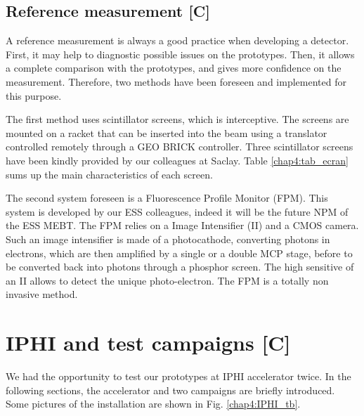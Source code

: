 \begin{refsection}
  \subsection{Reference measurement [C]}
  A reference measurement is always a good practice when developing a detector. First, it may help to diagnostic possible issues on the prototypes. Then, it allows a complete comparison with the prototypes, and gives more confidence on the measurement. Therefore, two methods have been foreseen and implemented for this purpose.

  The first method uses scintillator screens, which is interceptive. The screens are mounted on a racket that can be inserted into the beam using a translator controlled remotely through a GEO BRICK controller. Three scintillator screens have been kindly provided by our colleagues at Saclay. Table \ref{chap4:tab_ecran} sums up the main characteristics of each screen.

  

  The second system foreseen is a Fluorescence Profile Monitor (FPM). This system is developed by our ESS colleagues, indeed it will be the future NPM of the ESS MEBT. The FPM relies on a Image Intensifier (II) and a CMOS camera.
  Such an image intensifier is made of a photocathode, converting photons in electrons, which are then amplified by a single or a double MCP stage, before to be converted back into photons through a phosphor screen. The high sensitive of an II allows to detect the unique photo-electron. The FPM is a totally non invasive method.



  \section{IPHI and test campaigns [C]}
  We had the opportunity to test our prototypes at IPHI accelerator twice. In the following sections, the accelerator and two campaigns are briefly introduced. Some pictures of the installation are shown in Fig. \ref{chap4:IPHI_tb}.


\end{refsection}
